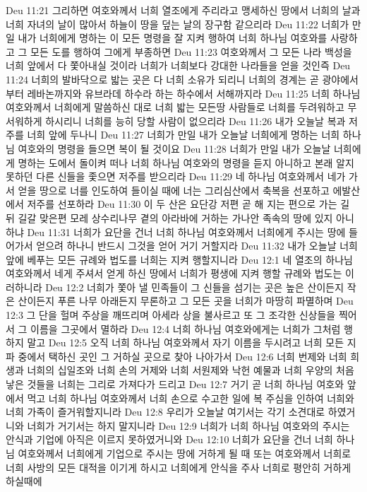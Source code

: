 Deu 11:21  그리하면 여호와께서 너희 열조에게 주리라고 맹세하신 땅에서 너희의 날과 너희 자녀의 날이 많아서 하늘이 땅을 덮는 날의 장구함 같으리라
Deu 11:22  너희가 만일 내가 너희에게 명하는 이 모든 명령을 잘 지켜 행하여 너희 하나님 여호와를 사랑하고 그 모든 도를 행하여 그에게 부종하면
Deu 11:23  여호와께서 그 모든 나라 백성을 너희 앞에서 다 쫓아내실 것이라 너희가 너희보다 강대한 나라들을 얻을 것인즉
Deu 11:24  너희의 발바닥으로 밟는 곳은 다 너희 소유가 되리니 너희의 경계는 곧 광야에서부터 레바논까지와 유브라데 하수라 하는 하수에서 서해까지라
Deu 11:25  너희 하나님 여호와께서 너희에게 말씀하신 대로 너희 밟는 모든땅 사람들로 너희를 두려워하고 무서워하게 하시리니 너희를 능히 당할 사람이 없으리라
Deu 11:26  내가 오늘날 복과 저주를 너희 앞에 두나니
Deu 11:27  너희가 만일 내가 오늘날 너희에게 명하는 너희 하나님 여호와의 명령을 들으면 복이 될 것이요
Deu 11:28  너희가 만일 내가 오늘날 너희에게 명하는 도에서 돌이켜 떠나 너희 하나님 여호와의 명령을 듣지 아니하고 본래 알지 못하던 다른 신들을 좇으면 저주를 받으리라
Deu 11:29  네 하나님 여호와께서 네가 가서 얻을 땅으로 너를 인도하여 들이실 때에 너는 그리심산에서 축복을 선포하고 에발산에서 저주를 선포하라
Deu 11:30  이 두 산은 요단강 저편 곧 해 지는 편으로 가는 길 뒤 길갈 맞은편 모레 상수리나무 곁의 아라바에 거하는 가나안 족속의 땅에 있지 아니하냐
Deu 11:31  너희가 요단을 건너 너희 하나님 여호와께서 너희에게 주시는 땅에 들어가서 얻으려 하나니 반드시 그것을 얻어 거기 거할지라
Deu 11:32  내가 오늘날 너희 앞에 베푸는 모든 규례와 법도를 너희는 지켜 행할지니라
Deu 12:1  네 열조의 하나님 여호와께서 네게 주셔서 얻게 하신 땅에서 너희가 평생에 지켜 행할 규례와 법도는 이러하니라
Deu 12:2  너희가 쫓아 낼 민족들이 그 신들을 섬기는 곳은 높은 산이든지 작은 산이든지 푸른 나무 아래든지 무론하고 그 모든 곳을 너희가 마땅히 파멸하며
Deu 12:3  그 단을 헐며 주상을 깨뜨리며 아세라 상을 불사르고 또 그 조각한 신상들을 찍어서 그 이름을 그곳에서 멸하라
Deu 12:4  너희 하나님 여호와에게는 너희가 그처럼 행하지 말고
Deu 12:5  오직 너희 하나님 여호와께서 자기 이름을 두시려고 너희 모든 지파 중에서 택하신 곳인 그 거하실 곳으로 찾아 나아가서
Deu 12:6  너희 번제와 너희 희생과 너희의 십일조와 너희 손의 거제와 너희 서원제와 낙헌 예물과 너희 우양의 처음 낳은 것들을 너희는 그리로 가져다가 드리고
Deu 12:7  거기 곧 너희 하나님 여호와 앞에서 먹고 너희 하나님 여호와께서 너희 손으로 수고한 일에 복 주심을 인하여 너희와 너희 가족이 즐거워할지니라
Deu 12:8  우리가 오늘날 여기서는 각기 소견대로 하였거니와 너희가 거기서는 하지 말지니라
Deu 12:9  너희가 너희 하나님 여호와의 주시는 안식과 기업에 아직은 이르지 못하였거니와
Deu 12:10  너희가 요단을 건너 너희 하나님 여호와께서 너희에게 기업으로 주시는 땅에 거하게 될 때 또는 여호와께서 너희로 너희 사방의 모든 대적을 이기게 하시고 너희에게 안식을 주사 너희로 평안히 거하게 하실때에
